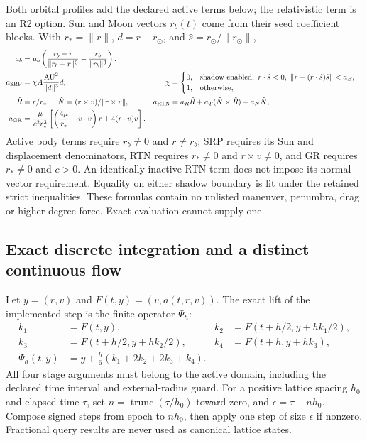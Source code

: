 Both orbital profiles add the declared active terms below; the relativistic
term is an R2 option. Sun and Moon vectors $r_b(t)$ come from their seed
coefficient blocks. With $r_*=\|r\|$, $d=r-r_\odot$, and $\hat s=r_\odot/\|r_\odot\|$,
\begin{align}
 a_b&=\mu_b\left(\frac{r_b-r}{\|r_b-r\|^3}-\frac{r_b}{\|r_b\|^3}\right),\\
 a_{\rm SRP}&=\chi A\frac{\mathrm{AU}^2}{\|d\|^3}d,
 &\chi&=\begin{cases}0,&\text{shadow enabled},\ r\cdot\hat s<0,
       \ \|r-(r\cdot\hat s)\hat s\|<a_E,\\1,&\text{otherwise},\end{cases}\\
 \hat R&=r/r_*,\quad \hat N=(r\times v)/\|r\times v\|,
 &a_{\rm RTN}&=a_R\hat R+a_T(\hat N\times\hat R)+a_N\hat N,\\
 a_{\rm GR}&=\frac{\mu}{c^2r_*^3}
 \left[\left(\frac{4\mu}{r_*}-v\cdot v\right)r+4(r\cdot v)v\right].
\end{align}
Active body terms require $r_b\ne0$ and $r\ne r_b$; SRP requires its Sun and
displacement denominators, RTN requires $r_*\ne0$ and $r\times v\ne0$, and GR
requires $r_*\ne0$ and $c>0$. An identically inactive RTN term does not impose
its normal-vector requirement. Equality on either shadow boundary is lit under
the retained strict inequalities. These formulas contain no unlisted maneuver,
penumbra, drag or higher-degree force. Exact evaluation cannot supply one.

\subsection{Exact discrete integration and a distinct continuous flow}
\label{sec:lift-flow}
Let $y=(r,v)$ and $F(t,y)=(v,a(t,r,v))$. The exact lift of the implemented step
is the finite operator $\Psi_h$:
\begin{align}
 k_1&=F(t,y),& k_2&=F(t+h/2,y+hk_1/2),\\
 k_3&=F(t+h/2,y+hk_2/2),& k_4&=F(t+h,y+hk_3),\\
 \Psi_h(t,y)&=y+\tfrac h6(k_1+2k_2+2k_3+k_4).
\end{align}
All four stage arguments must belong to the active domain, including the
declared time interval and external-radius guard. For a positive lattice spacing
$h_0$ and elapsed time $\tau$, set $n=\operatorname{trunc}(\tau/h_0)$ toward zero,
and $\epsilon=\tau-nh_0$. Compose signed steps from epoch to $nh_0$, then apply
one step of size $\epsilon$ if nonzero. Fractional query results are never used
as canonical lattice states.

